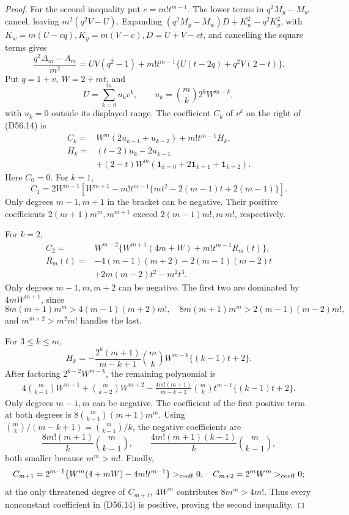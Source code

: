 \documentclass[11pt]{amsart}
\theoremstyle{definition}
\theoremstyle{remark}
\begin{document}
\begin{proof}
For the second inequality put \(c=m!t^{m-1}\). The lower terms in
\(q^2M_y-M_w\) cancel, leaving \(m^2(q^2V-U)\). Expanding
\((q^2M_y-M_w)D+K_w^2-q^2K_y^2\), with
\(K_w=m(U-cq), K_y=m(V-c), D=U+V-ct\), and cancelling the square
terms gives
\[
\frac{q^2\Delta_m-A_m}{m^2}
=UV(q^2-1)+m!t^{m-1}\{U(t-2q)+q^2V(2-t)\}.         \tag{D56.14}
\]
Put \(q=1+v,\ W=2+mt\), and
\[
U=\sum_{k=0}^m u_kv^k,\qquad
u_k=\binom mk2^kW^{m-k},
\]
with \(u_k=0\) outside its displayed range. The coefficient \(C_k\) of
\(v^k\) on the right of (D56.14) is
\[
\begin{split}
C_k={}&W^m(2u_{k-1}+u_{k-2})+m!t^{m-1}H_k,\\
H_k={}&(t-2)u_k-2u_{k-1}\\
&+(2-t)W^m(\mathbf1_{k=0}+2\mathbf1_{k=1}+\mathbf1_{k=2}).
\end{split}                                        \tag{D56.15}
\]
Here \(C_0=0\). For \(k=1\),
\[
C_1=2W^{m-1}\!\left[
W^{m+1}-m!t^{m-1}
\{mt^2-2(m-1)t+2(m-1)\}\right].
\]
Only degrees \(m-1,m+1\) in the bracket can be negative. Their positive
coefficients \(2(m+1)m^m,m^{m+1}\) exceed
\(2(m-1)m!,m\,m!\), respectively.

For \(k=2\),
\[
\begin{split}
C_2={}&W^{m-2}\{W^{m+1}(4m+W)+m!t^{m-1}R_m(t)\},\\
R_m(t)={}&-4(m-1)(m+2)-2(m-1)(m-2)t\\
&+2m(m-2)t^2-m^2t^3.
\end{split}
\]
Only degrees \(m-1,m,m+2\) can be negative. The first two are dominated
by \(4mW^{m+1}\), since
\[
8m(m+1)m^m>
4(m-1)(m+2)m!,\quad
8m(m+1)m^m>2(m-1)(m-2)m!,
\]
and \(m^{m+2}>m^2m!\) handles the last.

For \(3\leq k\leq m\),
\[
H_k=-\frac{2^k(m+1)}{m-k+1}\binom mk
W^{m-k}\{(k-1)t+2\}.
\]
After factoring \(2^{k-2}W^{m-k}\), the remaining polynomial is
\[
\begin{split}
4\binom m{k-1}W^{m+1}+\binom m{k-2}W^{m+2}
{}-\frac{4m!(m+1)}{m-k+1}\binom mk
t^{m-1}\{(k-1)t+2\}.
\end{split}
\]
Only degrees \(m-1,m\) can be negative. The coefficient of the first
positive term at both degrees is
\(8\binom m{k-1}(m+1)m^m\). Using
\(\binom mk/(m-k+1)=\binom m{k-1}/k\), the negative coefficients are
\[
\frac{8m!(m+1)}k\binom m{k-1},\qquad
\frac{4m!(m+1)(k-1)}k\binom m{k-1},
\]
both smaller because \(m^m>m!\). Finally,
\[
C_{m+1}=2^{m-1}\{W^m(4+mW)-4m!t^{m-1}\}>_{\rm coeff}0,\quad
C_{m+2}=2^mW^m>_{\rm coeff}0;
\]
at the only threatened degree of \(C_{m+1}\),
\(4W^m\) contributes \(8m^m>4m!\). Thus every nonconstant coefficient
in (D56.14) is positive, proving the second inequality.


\end{proof}
\end{document}
